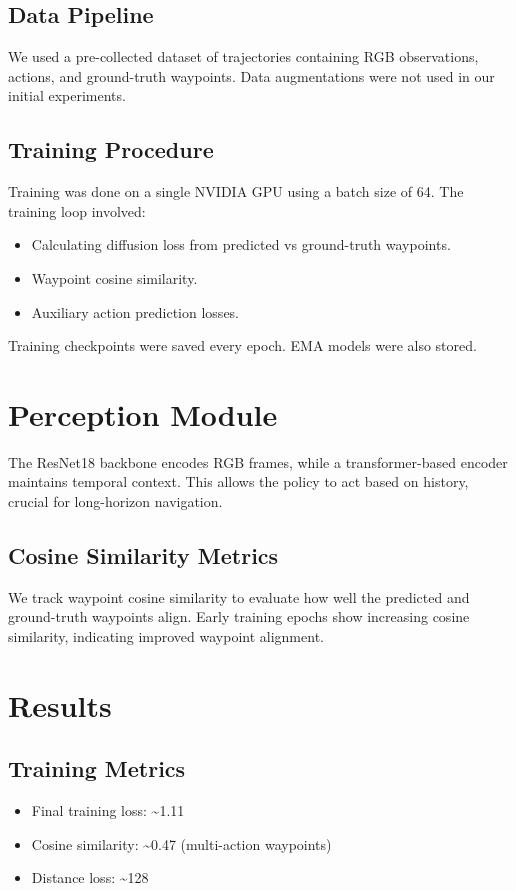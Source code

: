 \documentclass[12pt]{article}
\begin{document}
\subsection{Data Pipeline}
We used a pre-collected dataset of trajectories containing RGB observations, actions, and ground-truth waypoints. Data augmentations were not used in our initial experiments.

\subsection{Training Procedure}
Training was done on a single NVIDIA GPU using a batch size of 64. The training loop involved:
\begin{itemize}
\item Calculating diffusion loss from predicted vs ground-truth waypoints.
\item Waypoint cosine similarity.
\item Auxiliary action prediction losses.
\end{itemize}
Training checkpoints were saved every epoch. EMA models were also stored.

\section{Perception Module}
The ResNet18 backbone encodes RGB frames, while a transformer-based encoder maintains temporal context. This allows the policy to act based on history, crucial for long-horizon navigation.

\subsection{Cosine Similarity Metrics}
We track waypoint cosine similarity to evaluate how well the predicted and ground-truth waypoints align. Early training epochs show increasing cosine similarity, indicating improved waypoint alignment.

\section{Results}
\subsection{Training Metrics}
\begin{itemize}
\item Final training loss: \textasciitilde1.11
\item Cosine similarity: \textasciitilde0.47 (multi-action waypoints)
\item Distance loss: \textasciitilde128
\end{itemize}
\end{document}
